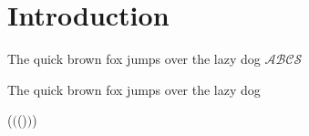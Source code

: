 \chapter{Introduction}

\noindent The quick brown fox jumps over the lazy dog $\mathscr{ABCS}$

\noindent\textsf{The quick brown fox jumps over the lazy dog}

($($()$)$)

\begin{dfn}
  \blindtext[1]
\end{dfn}

\Blindtext[2][1]


